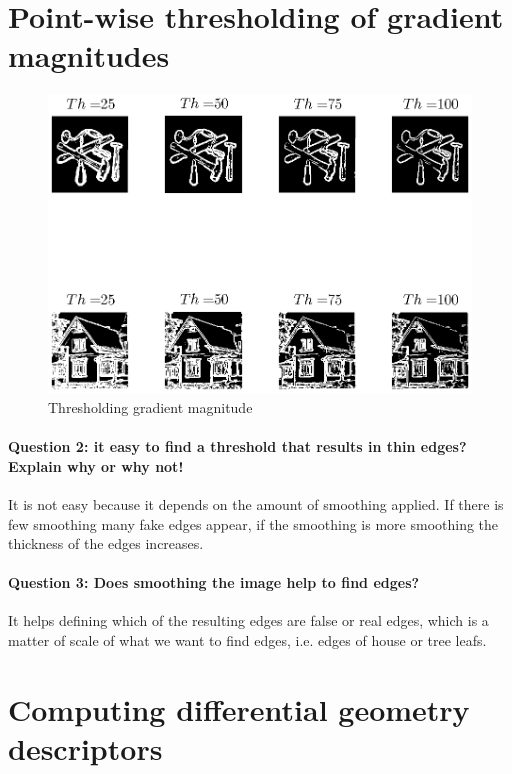 \documentclass[12pt]{article}
\begin{document}
\section{Point-wise thresholding of gradient magnitudes}

\begin{figure}[htbp]
 \centering
 \includegraphics[width=\textwidth]{q2b}
 \caption{Thresholding gradient magnitude}
 \label{fig:q2b}
\end{figure}

\paragraph{Question 2:
it easy to find a threshold that results in thin edges? Explain why or why not!}
It is not easy because it depends on the amount of smoothing applied. If there is few smoothing many fake edges appear, if the smoothing is more smoothing the thickness of the edges increases.

\paragraph{Question 3: Does smoothing the image help to find edges?}
It helps defining which of the resulting edges are false or real edges, which is a matter of scale of what we want to find edges, i.e. edges of house or tree leafs.

\section{Computing differential geometry descriptors}
\end{document}
